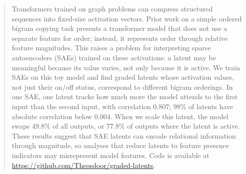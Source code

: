 
\begin{abstract}
  Transformers trained on graph problems can compress structured sequences into fixed-size activation vectors.
  Prior work on a simple ordered bigram copying task presents a transformer model that does not use a separate feature for order; instead, it represents order through relative feature magnitudes.
  This raises a problem for interpreting sparse autoencoders (SAEs) trained on these activations: a latent may be meaningful because its value varies, not only because it is active.
  We train SAEs on this toy model and find graded latents whose activation values, not just their on/off status, correspond to different bigram orderings.
  In one SAE, one latent tracks how much more the model attends to the first input than the second input, with correlation 0.807; 98\% of latents have absolute correlation below 0.004.
  When we scale this latent, the model swaps 49.8\% of all outputs, or 77.8\% of outputs where the latent is active.
  These results suggest that SAE latents can encode relational information through magnitude, so analyses that reduce latents to feature presence indicators may misrepresent model features.
  Code is available at \url{https://github.com/Theosdoor/graded-latents}.
\end{abstract}
